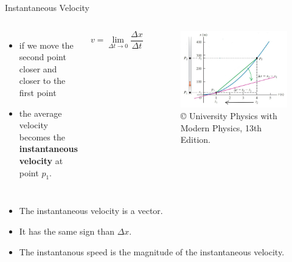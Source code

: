 \documentclass[]{beamer}
\begin{document}
\begin{frame}
Instantaneous Velocity
\vspace{3mm}
   \begin{columns}[c]
   \column{2in}  %
  
\begin{itemize}
\item  if we move the second point closer and closer to the first point
\item   the average velocity becomes the \textbf{instantaneous velocity} at point $p_1$.

\end{itemize}

\begin{equation*}
\boxed{v=\lim_{\Delta t\to0} \frac{\Delta x}{\Delta t}}
\end{equation*}


   \column{2.5in}
   
   \begin{figure}[h!]
 
  \includegraphics[width=1.\textwidth]{images/8.jpg}
   \caption{ {\tiny © University Physics 
   with Modern Physics, 13th Edition.} }
\end{figure}

   \end{columns}

 \end{frame}




\begin{frame}
\begin{itemize}
\item  The instantaneous velocity is a vector.
\pause
\item It has the same sign than $\Delta x$.
\pause
\item The instantanous speed is the magnitude of the instantaneous velocity.

\end{itemize}

 \end{frame}
\end{document}
